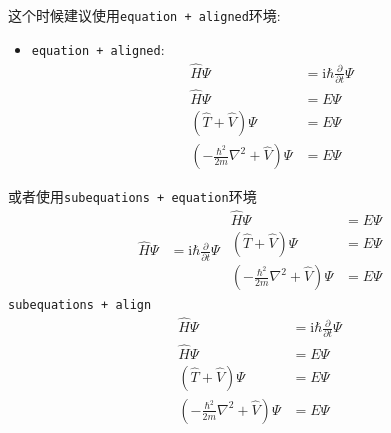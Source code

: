 这个时候建议使用\textcolor{red!50!black}{\Verb"equation + aligned"}环境:
\begin{itemize}
    \item \textcolor{red!50!black}{\Verb"equation + aligned"}:
    \begin{equation}
    \begin{aligned}
        \hat{H} \Psi & = \mathrm{i} \hbar \frac{\partial}{\partial t} \Psi \\
        \hat{H} \Psi & = E \Psi \\
        \left( \hat{T} + \hat{V} \right) \Psi & = E \Psi \\
        \left( - \frac{\hbar^2}{2 m} \nabla^2 + \hat{V} \right) \Psi & = E \Psi    
        \end{aligned}
    \end{equation}
\end{itemize}
或者使用\textcolor{red!50!black}{\Verb"subequations + equation"}环境
\begin{subequations}
    \begin{equation}
    \begin{aligned}
        \hat{H} \Psi & = \mathrm{i} \hbar \frac{\partial}{\partial t} \Psi
    \end{aligned}
    \end{equation}
    \begin{equation}
    \begin{aligned}
        \hat{H} \Psi & = E \Psi \\
        \left( \hat{T} + \hat{V} \right) \Psi & = E \Psi \\
        \left( - \frac{\hbar^2}{2 m} \nabla^2 + \hat{V} \right) \Psi & = E \Psi    
        \end{aligned}
    \end{equation}
\end{subequations}
\textcolor{red!50!black}{\Verb"subequations + align"}
\begin{subequations}
    \begin{align}
        \hat{H} \Psi & = \mathrm{i} \hbar \frac{\partial}{\partial t} \Psi \\
        \hat{H} \Psi & = E \Psi \\
        \left( \hat{T} + \hat{V} \right) \Psi & = E \Psi \\
        \left( - \frac{\hbar^2}{2 m} \nabla^2 + \hat{V} \right) \Psi & = E \Psi    
    \end{align}
\end{subequations}

